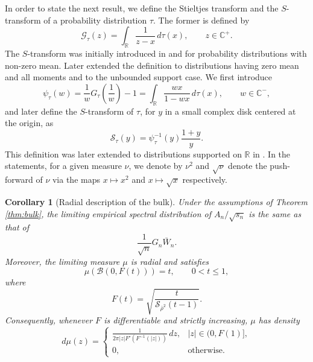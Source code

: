 \documentclass[11pt,oneside]{amsart}
\theoremstyle{plain}
\newtheorem{corollary}[theorem]{Corollary}
\numberwithin{equation}{section}
\newcommand{\R}{\mathbb{R}}
\newcommand{\scaling}{s_n}
\begin{document}
\noindent
In order to state the next result, we define the Stieltjes transform and the $S$-transform of a probability distribution $\tau$. The former is defined by
\begin{equation}
    \mathcal{G}_\tau(z) = \int_{\R} \frac{1}{z-x} \, d\tau(x), \qquad z \in \mathbb{C}^+.
\end{equation}
 The $S$-transform was initially introduced in \cite{Voiculescu} and \cite{BerVoi} for probability distributions with non-zero mean. Later \cite{RaoSpeichert} extended the definition to distributions having zero mean and all moments and \cite{ArizmendiPerezAbreu} to the unbounded support case.
We first introduce
\begin{equation}
    \psi_\tau(w) = \frac{1}{w} G_\tau\left(\frac 1 w\right) -1 = \int_\R \frac{wx}{1-wx} \, d\tau(x), \qquad w\in \mathbb{C}^-,
\end{equation}
and later define the $S$-transform of $\tau$, for $y$ in a small complex disk centered at the origin, as
\begin{equation} \label{eq:S}
    \mathcal{S}_\tau(y) = \psi_\tau^{-1}(y)\frac{1+y}{y}.
\end{equation}
This definition was later extended to distributions supported on $\mathbb{R}$ in \cite{ArizmendiPerezAbreu}.
In the statements, for a given measure $\nu$, we denote by $\nu^2$ and $\sqrt{\nu}$ denote the push-forward of $\nu$ via the maps $x \mapsto x^2$ and $x\mapsto \sqrt{x}$ respectively.


\begin{corollary}[Radial description of the bulk]
\label{cor:bulk}
Under the assumptions of Theorem \ref{thm:bulk}, the limiting empirical spectral distribution of $A_n/\sqrt{\scaling}$ is the same as that of
\begin{equation}
\frac1{\sqrt n}G_n\bar W_n .
\end{equation}
Moreover, the limiting measure $\mu$ is radial and satisfies
\begin{equation}
\mu\left(\mathcal B(0,F(t))\right)=t,
\qquad 0<t\le 1,
\end{equation}
where
\begin{equation}
F(t)=\sqrt{\frac{t}{\mathcal S_{\bar\rho^2}(t-1)}} .
\end{equation}
Consequently, whenever $F$ is differentiable and strictly increasing, $\mu$ has density
\begin{equation}
d\mu(z)=
\begin{cases}
\frac{1}{2\pi |z| F'(F^{-1}(|z|))}\,d z,
& |z|\in(0,F(1)],\\
0, & \text{otherwise}.
\end{cases}
\end{equation}
\end{corollary}
\end{document}
